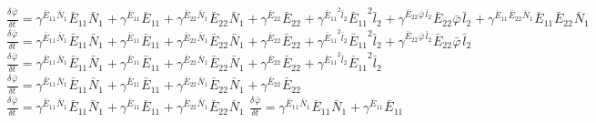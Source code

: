 $\frac{{\delta}^{} {\bar{\varphi}}_{}}{{\delta} {{{t}}_{}}^{}} = {\gamma}^{{{{\bar{E}}_{11}}^{}{{\bar{N}}_{1}}^{}}}{{{\bar{E}}_{11}}^{}{{\bar{N}}_{1}}^{}} + {\gamma}^{{{{\bar{E}}_{11}}^{}}}{{{\bar{E}}_{11}}^{}} + {\gamma}^{{{{\bar{E}}_{22}}^{}{{\bar{N}}_{1}}^{}}}{{{\bar{E}}_{22}}^{}{{\bar{N}}_{1}}^{}} + {\gamma}^{{{{\bar{E}}_{22}}^{}}}{{{\bar{E}}_{22}}^{}} + {\gamma}^{{{{\bar{E}}_{11}}^{2}{{\bar{l}}_{2}}^{}}}{{{\bar{E}}_{11}}^{2}{{\bar{l}}_{2}}^{}} + {\gamma}^{{{{\bar{E}}_{22}}^{}{{\bar{\varphi}}_{}}^{}{{\bar{l}}_{2}}^{}}}{{{\bar{E}}_{22}}^{}{{\bar{\varphi}}_{}}^{}{{\bar{l}}_{2}}^{}} + {\gamma}^{{{{\bar{E}}_{11}}^{}{{\bar{E}}_{22}}^{}{{\bar{N}}_{1}}^{}}}{{{\bar{E}}_{11}}^{}{{\bar{E}}_{22}}^{}{{\bar{N}}_{1}}^{}}$
$\frac{{\delta}^{} {\bar{\varphi}}_{}}{{\delta} {{{t}}_{}}^{}} = {\gamma}^{{{{\bar{E}}_{11}}^{}{{\bar{N}}_{1}}^{}}}{{{\bar{E}}_{11}}^{}{{\bar{N}}_{1}}^{}} + {\gamma}^{{{{\bar{E}}_{11}}^{}}}{{{\bar{E}}_{11}}^{}} + {\gamma}^{{{{\bar{E}}_{22}}^{}{{\bar{N}}_{1}}^{}}}{{{\bar{E}}_{22}}^{}{{\bar{N}}_{1}}^{}} + {\gamma}^{{{{\bar{E}}_{22}}^{}}}{{{\bar{E}}_{22}}^{}} + {\gamma}^{{{{\bar{E}}_{11}}^{2}{{\bar{l}}_{2}}^{}}}{{{\bar{E}}_{11}}^{2}{{\bar{l}}_{2}}^{}} + {\gamma}^{{{{\bar{E}}_{22}}^{}{{\bar{\varphi}}_{}}^{}{{\bar{l}}_{2}}^{}}}{{{\bar{E}}_{22}}^{}{{\bar{\varphi}}_{}}^{}{{\bar{l}}_{2}}^{}}$
$\frac{{\delta}^{} {\bar{\varphi}}_{}}{{\delta} {{{t}}_{}}^{}} = {\gamma}^{{{{\bar{E}}_{11}}^{}{{\bar{N}}_{1}}^{}}}{{{\bar{E}}_{11}}^{}{{\bar{N}}_{1}}^{}} + {\gamma}^{{{{\bar{E}}_{11}}^{}}}{{{\bar{E}}_{11}}^{}} + {\gamma}^{{{{\bar{E}}_{22}}^{}{{\bar{N}}_{1}}^{}}}{{{\bar{E}}_{22}}^{}{{\bar{N}}_{1}}^{}} + {\gamma}^{{{{\bar{E}}_{22}}^{}}}{{{\bar{E}}_{22}}^{}} + {\gamma}^{{{{\bar{E}}_{11}}^{2}{{\bar{l}}_{2}}^{}}}{{{\bar{E}}_{11}}^{2}{{\bar{l}}_{2}}^{}}$
$\frac{{\delta}^{} {\bar{\varphi}}_{}}{{\delta} {{{t}}_{}}^{}} = {\gamma}^{{{{\bar{E}}_{11}}^{}{{\bar{N}}_{1}}^{}}}{{{\bar{E}}_{11}}^{}{{\bar{N}}_{1}}^{}} + {\gamma}^{{{{\bar{E}}_{11}}^{}}}{{{\bar{E}}_{11}}^{}} + {\gamma}^{{{{\bar{E}}_{22}}^{}{{\bar{N}}_{1}}^{}}}{{{\bar{E}}_{22}}^{}{{\bar{N}}_{1}}^{}} + {\gamma}^{{{{\bar{E}}_{22}}^{}}}{{{\bar{E}}_{22}}^{}}$
$\frac{{\delta}^{} {\bar{\varphi}}_{}}{{\delta} {{{t}}_{}}^{}} = {\gamma}^{{{{\bar{E}}_{11}}^{}{{\bar{N}}_{1}}^{}}}{{{\bar{E}}_{11}}^{}{{\bar{N}}_{1}}^{}} + {\gamma}^{{{{\bar{E}}_{11}}^{}}}{{{\bar{E}}_{11}}^{}} + {\gamma}^{{{{\bar{E}}_{22}}^{}{{\bar{N}}_{1}}^{}}}{{{\bar{E}}_{22}}^{}{{\bar{N}}_{1}}^{}}$
$\frac{{\delta}^{} {\bar{\varphi}}_{}}{{\delta} {{{t}}_{}}^{}} = {\gamma}^{{{{\bar{E}}_{11}}^{}{{\bar{N}}_{1}}^{}}}{{{\bar{E}}_{11}}^{}{{\bar{N}}_{1}}^{}} + {\gamma}^{{{{\bar{E}}_{11}}^{}}}{{{\bar{E}}_{11}}^{}}$
